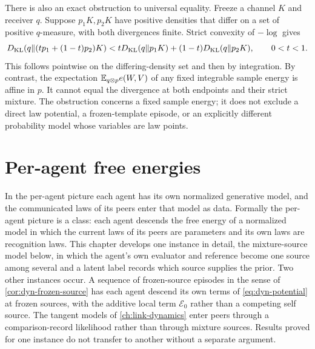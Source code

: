 There is also an exact obstruction to universal equality. Freeze a channel $K$ and receiver $q$. Suppose $p_1K,p_2K$ have positive densities that differ on a set of positive $q$-measure, with both divergences finite. Strict convexity of $-\log$ gives
\begin{equation}
 D_{\mathrm{KL}}(q\Vert (tp_1+(1-t)p_2)K)
 <tD_{\mathrm{KL}}(q\Vert p_1K)+(1-t)D_{\mathrm{KL}}(q\Vert p_2K),\qquad 0<t<1.
 \label{eq:dyn-affine-obstruction}
\end{equation}
This follows pointwise on the differing-density set and then by integration. By contrast, the expectation $\mathbb E_{q\otimes p}e(W,V)$ of any fixed integrable sample energy is affine in $p$. It cannot equal the divergence at both endpoints and their strict mixture. The obstruction concerns a fixed sample energy; it does not exclude a direct law potential, a frozen-template episode, or an explicitly different probability model whose variables are law points.

\section{Per-agent free energies}
\label{sec:dyn-per-agent}

In the per-agent picture each agent has its own normalized generative model, and the communicated laws of its peers enter that model as data. Formally the per-agent picture is a class: each agent descends the free energy of a normalized model in which the current laws of its peers are parameters and its own laws are recognition laws. This chapter develops one instance in detail, the mixture-source model below, in which the agent's own evaluator and reference become one source among several and a latent label records which source supplies the prior. Two other instances occur. A sequence of frozen-source episodes in the sense of \cref{cor:dyn-frozen-source} has each agent descend its own terms of \cref{eq:dyn-potential} at frozen sources, with the additive local term $\mathcal E_0$ rather than a competing self source. The tangent models of \cref{ch:link-dynamics} enter peers through a comparison-record likelihood rather than through mixture sources. Results proved for one instance do not transfer to another without a separate argument.


